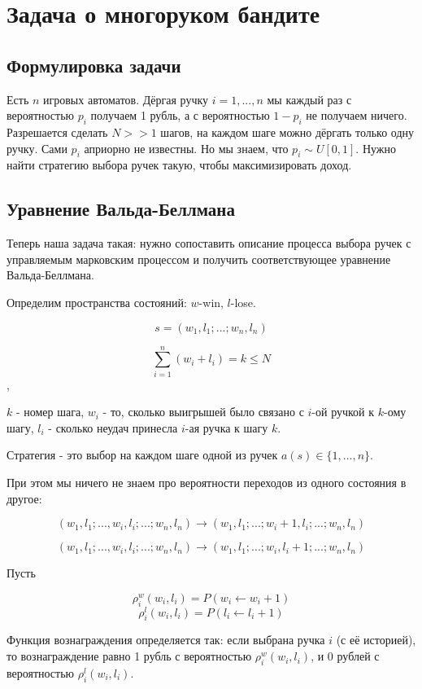 \documentclass[a4paper]{article}
\author{Васильев Павел}
\begin{document}
\section*{Задача о многоруком бандите}

\subsection*{Формулировка задачи}

Есть $n$ игровых автоматов. Дёргая ручку $i = 1, ..., n$ мы каждый раз с вероятностью $p_i$ получаем 1 рубль, а с вероятностью $1-p_i$ не получаем ничего. Разрешается сделать $N >> 1$ шагов, на каждом шаге можно дёргать только одну ручку. Сами $p_i$ априорно не известны. Но мы знаем, что $p_i \sim U[0,1]$. Нужно найти стратегию выбора ручек такую, чтобы максимизировать доход.

\subsection*{Уравнение Вальда-Беллмана}

Теперь наша задача такая: нужно сопоставить описание процесса выбора ручек с управляемым марковским процессом и получить соответствующее уравнение Вальда-Беллмана.

Определим пространства состояний: $w$-win, $l$-lose.

\[ s = (w_1, l_1; ...; w_n, l_n) \]

\[ \sum_{i=1}^n (w_i + l_i) = k \leq N \],

$k$ - номер шага, $w_i$ - то, сколько выигрышей было связано с $i$-ой ручкой к $k$-ому шагу, $l_i$ - сколько неудач принесла $i$-ая ручка к шагу $k$.

Стратегия  - это выбор на каждом шаге одной из ручек $a(s) \in \{ 1, ..., n \}$.

При этом мы ничего не знаем про вероятности переходов из одного состояния в другое:

\[ (w_1, l_1; ..., w_i, l_i; ...; w_n,l_n) \rightarrow (w_1, l_1; ...; w_i+1, l_i; ...; w_n,l_n) \]

\[ (w_1, l_1; ..., w_i, l_i; ...; w_n,l_n) \rightarrow (w_1, l_1; ...; w_i, l_i+1; ...; w_n,l_n) \]

Пусть 

\[ \rho_i^w (w_i, l_i) = P(w_i \leftarrow w_i+1) \]
\[\rho_i^l (w_i, l_i) = P(l_i \leftarrow l_i+1)\]

Функция вознаграждения определяется так: если выбрана ручка $i$ (с её историей), то вознаграждение равно 1 рубль с вероятностью $\rho_i^w (w_i, l_i)$, и 0 рублей с вероятностью $\rho_i^l (w_i, l_i)$.
\end{document}
